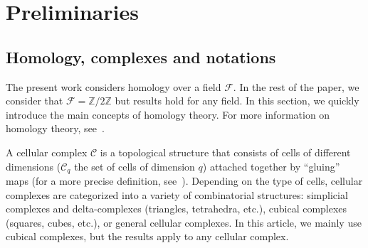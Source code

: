 \documentclass[runningheads]{llncs}
\let\Oldsection\section
\renewcommand{\section}{\FloatBarrier\Oldsection}
\let\Oldsubsection\subsection
\renewcommand{\subsection}{\FloatBarrier\Oldsubsection}
\newcommand{\Z}{\mathbb{Z}}
\newcommand{\REVIEW}[1]{{\color{red}$[$\textbf{REVIEW: }\textit{#1}$]$}}
\newcommand{\commentAlex}[1]{{\textit{\color{magenta}#1}}}
\begin{document}
\section{Preliminaries}\label{sect:preliminaries}

\subsection{Homology, complexes and notations}
The present work considers homology over a field $\mathcal{F}$.
In the rest of the paper, we consider that $\mathcal F = \Z/2\Z$ but results hold for any field.
In this section, we quickly introduce the main concepts of homology theory.
For more information on homology theory, see~\cite{hatcher-algebraic_topology}.

A cellular complex $\mathscr C$ is a topological structure that consists of cells of different dimensions ($\mathscr C_q$ the set of cells of dimension $q$) attached together by ``gluing'' maps (for a more precise definition, see~\cite{hatcher-algebraic_topology}).
Depending on the type of cells, cellular complexes are categorized into a variety of combinatorial structures: simplicial complexes and delta-complexes (triangles, tetrahedra, etc.), cubical complexes (squares, cubes, etc.), or general cellular complexes.
In this article, we mainly use cubical complexes, but the results apply to any cellular complex.
\end{document}
